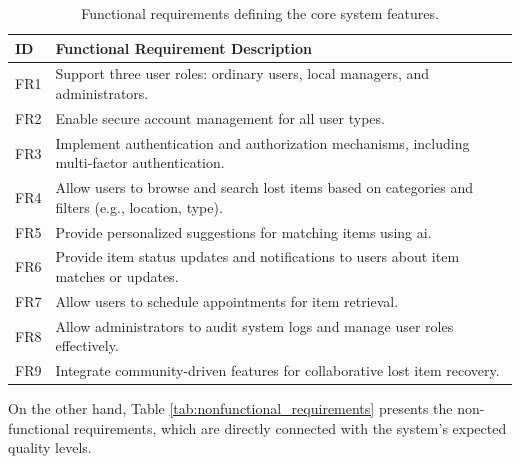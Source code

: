 \begin{table}[!htb]
    \centering
    \begin{tabular}{|p{}|p{}|}
        \hline
        \textbf{ID} & \textbf{Functional Requirement Description} \\ \hline
        FR1 & Support three user roles: ordinary users, local managers, and administrators. \\ \hline
        FR2 & Enable secure account management for all user types. \\ \hline
        FR3 & Implement authentication and authorization mechanisms, including multi-factor authentication. \\ \hline
        FR4 & Allow users to browse and search lost items based on categories and filters (e.g., location, type). \\ \hline
        FR5 & Provide personalized suggestions for matching items using \ac{ai}. \\ \hline
        FR6 & Provide item status updates and notifications to users about item matches or updates. \\ \hline
        FR7 & Allow users to schedule appointments for item retrieval. \\ \hline
        FR8 & Allow administrators to audit system logs and manage user roles effectively. \\ \hline
        FR9 & Integrate community-driven features for collaborative lost item recovery. \\ \hline
    \end{tabular}
    \caption[Functional Requirements]{Functional requirements defining the core system features.}
    \label{tab:functional_requirements}
\end{table}

On the other hand, Table \ref{tab:nonfunctional_requirements} presents the non-functional requirements, which are directly connected with the system's expected quality levels.

